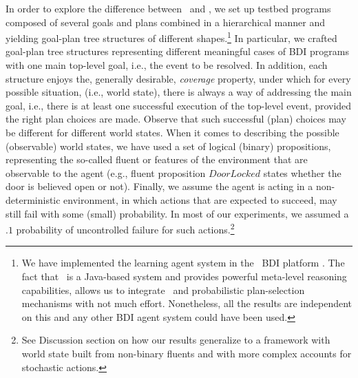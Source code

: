 

	

In order to explore the difference between \BUL\ and \CL, we set up testbed
programs composed of several goals and plans combined in a hierarchical manner
and yielding goal-plan tree structures of different shapes.\footnote{We have
implemented the learning agent system in the \JACK\ BDI platform
\cite{Busetta99jack}. The fact that \JACK\ is a Java-based system and
provides powerful meta-level reasoning capabilities, allows us to integrate \weka\ and
probabilistic plan-selection mechanisms with not much effort. Nonetheless, all
the results are independent on this and any other BDI agent system could
have been used.}
In particular, we crafted goal-plan tree structures representing different
meaningful cases of BDI programs with one main top-level goal, i.e., the event to
be resolved. In addition, each structure enjoys the, generally desirable,
\emph{coverage} property, under which for every possible situation, (i.e., world
state), there is always a way of addressing the main goal, i.e., there is at
least one successful execution of the top-level event, provided the right plan
choices are made. Observe that such successful (plan) choices may be different
for different world states.
When it comes to describing the possible (observable) world states, we have used
a set of logical (binary) propositions, representing the so-called fluent or
features of the environment that are observable to the agent (e.g., fluent
proposition $\mathit{DoorLocked}$ states whether the door is believed open or
not).
Finally, we assume the agent is acting in a non-deterministic environment, in
which actions that are expected to succeed, may still fail with some (small)
probability. In most of our experiments, we assumed a $.1$ probability of
uncontrolled failure for such actions.\footnote{See Discussion section on how our
results generalize to a framework with world state built from non-binary fluents
and with more complex accounts for stochastic actions.}





